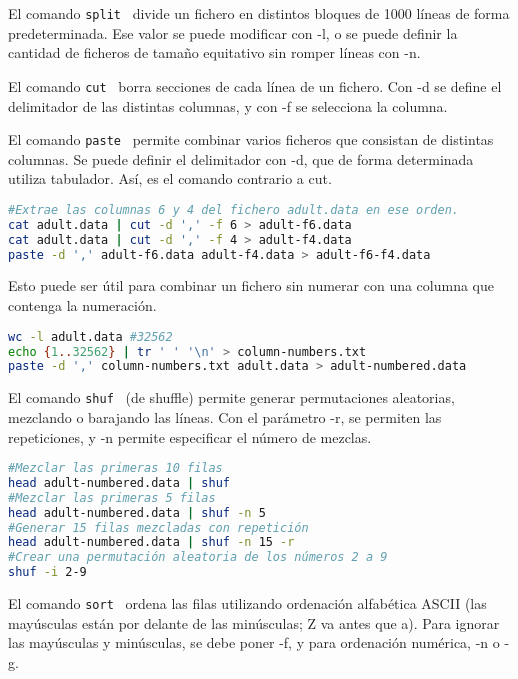 El comando \texttt{split}  \  divide un fichero en distintos bloques de 1000 líneas de forma predeterminada. Ese valor se puede modificar con -l, o se puede definir la cantidad de ficheros de tamaño equitativo sin romper líneas con -n.

El comando \texttt{cut}  \ borra secciones de cada línea de un fichero. Con -d se define el delimitador de las distintas columnas, y con -f se selecciona la columna.

El comando \texttt{paste}  \ permite combinar varios ficheros que consistan de distintas columnas. Se puede definir el delimitador con -d, que de forma determinada utiliza tabulador. Así, es el comando contrario a cut. 

\begin{lstlisting}[language=bash]
#Extrae las columnas 6 y 4 del fichero adult.data en ese orden.
cat adult.data | cut -d ',' -f 6 > adult-f6.data
cat adult.data | cut -d ',' -f 4 > adult-f4.data
paste -d ',' adult-f6.data adult-f4.data > adult-f6-f4.data
\end{lstlisting}

Esto puede ser útil para combinar un fichero sin numerar con una columna que contenga la numeración.
\begin{lstlisting}[language=bash]
wc -l adult.data #32562
echo {1..32562} | tr ' ' '\n' > column-numbers.txt
paste -d ',' column-numbers.txt adult.data > adult-numbered.data
\end{lstlisting}

El comando \texttt{shuf}  \  (de shuffle) permite generar permutaciones aleatorias, mezclando o barajando las líneas. Con el parámetro -r, se permiten las repeticiones, y -n permite especificar el número de mezclas.
\begin{lstlisting}[language=bash]
#Mezclar las primeras 10 filas
head adult-numbered.data | shuf
#Mezclar las primeras 5 filas
head adult-numbered.data | shuf -n 5
#Generar 15 filas mezcladas con repetición
head adult-numbered.data | shuf -n 15 -r
#Crear una permutación aleatoria de los números 2 a 9
shuf -i 2-9
\end{lstlisting}
 
 El comando \texttt{sort}  \ ordena las filas utilizando ordenación alfabética ASCII (las mayúsculas están por delante de las minúsculas; Z va antes que a). Para ignorar las mayúsculas y minúsculas, se debe poner -f, y para ordenación numérica, -n o -g. 
 
